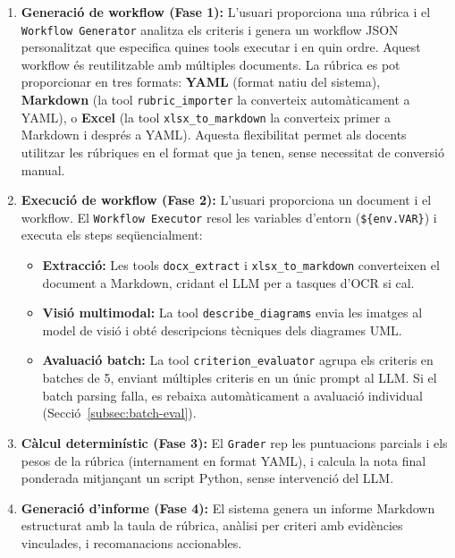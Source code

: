 \documentclass[12pt,a4paper,twoside]{report}
\begin{document}
\begin{enumerate}
    \item \textbf{Generaci\'o de workflow (Fase 1):} L'usuari proporciona una r\'ubrica i el \texttt{Workflow Generator} analitza els criteris i genera un workflow JSON personalitzat que especifica quines tools executar i en quin ordre. Aquest workflow \'es reutilitzable amb m\'ultiples documents. La r\'ubrica es pot proporcionar en tres formats: \textbf{YAML} (format natiu del sistema), \textbf{Markdown} (la tool \texttt{rubric\_importer} la converteix autom\`aticament a YAML), o \textbf{Excel} (la tool \texttt{xlsx\_to\_markdown} la converteix primer a Markdown i despr\'es a YAML). Aquesta flexibilitat permet als docents utilitzar les r\'ubriques en el format que ja tenen, sense necessitat de conversi\'o manual.
    \item \textbf{Execuci\'o de workflow (Fase 2):} L'usuari proporciona un document i el workflow. El \texttt{Workflow Executor} resol les variables d'entorn (\texttt{\$\{env.VAR\}}) i executa els steps seq\"uencialment:
    \begin{itemize}
        \item \textbf{Extracci\'o:} Les tools \texttt{docx\_extract} i \texttt{xlsx\_to\_markdown} converteixen el document a Markdown, cridant el LLM per a tasques d'OCR si cal.
        \item \textbf{Visi\'o multimodal:} La tool \texttt{describe\_diagrams} envia les imatges al model de visi\'o i obt\'e descripcions t\`ecniques dels diagrames UML.
        \item \textbf{Avaluaci\'o batch:} La tool \texttt{criterion\_evaluator} agrupa els criteris en batches de 5, enviant m\'ultiples criteris en un \'unic prompt al LLM. Si el batch parsing falla, es rebaixa autom\`aticament a avaluaci\'o individual (Secci\'o~\ref{subsec:batch-eval}).
    \end{itemize}
    \item \textbf{C\`alcul determin\'istic (Fase 3):} El \texttt{Grader} rep les puntuacions parcials i els pesos de la r\'ubrica (internament en format YAML), i calcula la nota final ponderada mitjan\c{c}ant un script Python, sense intervenci\'o del LLM.
    \item \textbf{Generaci\'o d'informe (Fase 4):} El sistema genera un informe Markdown estructurat amb la taula de r\'ubrica, an\`alisi per criteri amb evid\`encies vinculades, i recomanacions accionables.
\end{enumerate}
\end{document}
